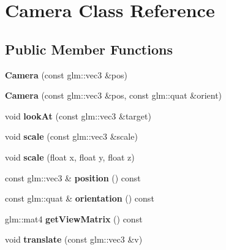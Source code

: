 \hypertarget{class_camera}{}\section{Camera Class Reference}
\label{class_camera}
\subsection*{Public Member Functions}
\begin{DoxyCompactItemize}
\item 
\mbox{\label{class_camera_acee2a1b3d56b0f141a3c6ee82735ed39}} 
{\bfseries Camera} (const glm\+::vec3 \&pos)
\item 
\mbox{\label{class_camera_a9e5dda23dca2ae363424f7a9025f55c9}} 
{\bfseries Camera} (const glm\+::vec3 \&pos, const glm\+::quat \&orient)
\item 
\mbox{\label{class_camera_aec0442093303b9568a159f8c87f8b7d8}} 
void {\bfseries look\+At} (const glm\+::vec3 \&target)
\item 
\mbox{\label{class_camera_afc008b2c6366c016c824d1244f8a6bf8}} 
void {\bfseries scale} (const glm\+::vec3 \&scale)
\item 
\mbox{\label{class_camera_afcd173158eee09a5dd919b175b74957d}} 
void {\bfseries scale} (float x, float y, float z)
\item 
\mbox{\label{class_camera_a26f5c28317ec7add2a21ddbdc8e463fb}} 
const glm\+::vec3 \& {\bfseries position} () const
\item 
\mbox{\label{class_camera_a872dd113215278493380d19716c63644}} 
const glm\+::quat \& {\bfseries orientation} () const
\item 
\mbox{\label{class_camera_a2f90e661a78172675ca06ea69667b531}} 
glm\+::mat4 {\bfseries get\+View\+Matrix} () const
\item 
\mbox{\label{class_camera_aa00429d00bae4984467f9c5d1a3bd158}} 
void {\bfseries translate} (const glm\+::vec3 \&v)
\item 
\mbox{\label{class_camera_ac9e53556c53beee69c77a97e2a1c1068}} 

\end{DoxyCompactItemize}
